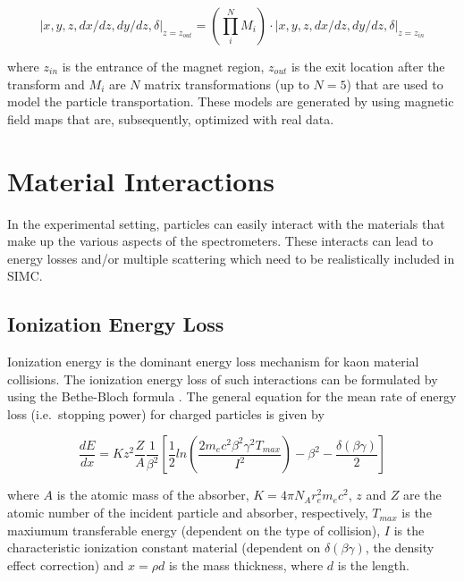 \documentclass[
]{report}
\begin{document}
\begin{equation} 
  \left|x,y,z,dx/dz,dy/dz,\delta\right|_{z=z_{out}}=(\prod^N_iM_i)\cdot\left|x,y,z,dx/dz,dy/dz,\delta\right|_{z=z_{in}}
  \label{eq:cosy_transform} 
\end{equation}

\noindent where \(z_{in}\) is the entrance of the magnet region,
\(z_{out}\) is the exit location after the transform and \(M_i\) are
\(N\) matrix transformations (up to \(N=5\)) that are used to model the
particle transportation. These models are generated by using magnetic
field maps that are, subsequently, optimized with real data.

\hypertarget{Section-6.4}{%
\section{Material Interactions}\label{Section-6.4}}

In the experimental setting, particles can easily interact with the
materials that make up the various aspects of the spectrometers. These
interacts can lead to energy losses and/or multiple scattering which
need to be realistically included in SIMC.

\hypertarget{ionization-energy-loss}{%
\subsection{Ionization Energy Loss}\label{ionization-energy-loss}}

Ionization energy is the dominant energy loss mechanism for kaon
material collisions. The ionization energy loss of such interactions can
be formulated by using the Bethe-Bloch formula
\cite{gmp_collaboration_ionization_2015}. The general equation for the
mean rate of energy loss (i.e.~stopping power) for charged particles is
given by

\begin{equation} 
  \frac{dE}{dx}=Kz^2\frac{Z}{A}\frac{1}{\beta^2}[\frac{1}{2}ln(\frac{2m_ec^2\beta^2\gamma^2T_{max}}{I^2})-\beta^2-\frac{\delta(\beta\gamma)}{2}]
  \label{eq:stop_power} 
\end{equation}

\noindent where \(A\) is the atomic mass of the absorber,
\(K=4\pi N_Ar^2_em_ec^2\), \(z\) and \(Z\) are the atomic number of the
incident particle and absorber, respectively, \(T_{max}\) is the
maxiumum transferable energy (dependent on the type of collision), \(I\)
is the characteristic ionization constant material (dependent on
\(\delta(\beta\gamma)\), the density effect correction) and \(x=\rho d\)
is the mass thickness, where \(d\) is the length.
\end{document}

